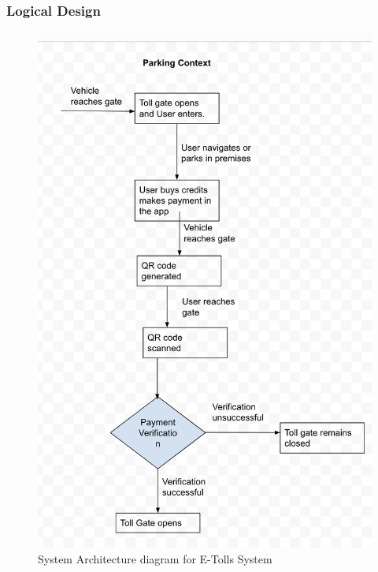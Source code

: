 \subsubsection{Logical Design}
\begin{figure}
    \begin{center}
        \includegraphics[scale = 0.6]{images/userflowdiagram}
        \caption{System Architecture diagram for E-Tolls System}
    \end{center}
\end{figure}

